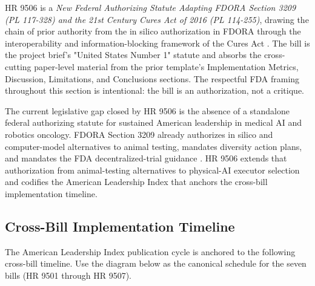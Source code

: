 
HR 9506 is a \textit{New Federal Authorizing Statute Adapting FDORA
Section 3209 (PL 117-328) and the 21st Century Cures Act of 2016
(PL 114-255)}, drawing the chain of prior authority from the in
silico authorization in FDORA through the interoperability and
information-blocking framework of the Cures Act
\cite{rank4_fdora_fda_modernization_2022, rank1_cures_act_2016}.
The bill is the project brief's "United States Number 1" statute and
absorbs the cross-cutting paper-level material from the prior
template's Implementation Metrics, Discussion, Limitations, and
Conclusions sections. The respectful FDA framing throughout this
section is intentional: the bill is an authorization, not a critique.

The current legislative gap closed by HR 9506 is the absence of a
standalone federal authorizing statute for sustained American
leadership in medical AI and robotics oncology. FDORA Section 3209
already authorizes in silico and computer-model alternatives to
animal testing, mandates diversity action plans, and mandates the
FDA decentralized-trial guidance \cite{rank4_fdora_fda_modernization_2022,
fda_dct_guidance_2024}. HR 9506 extends that authorization from
animal-testing alternatives to physical-AI executor selection and
codifies the American Leadership Index that anchors the cross-bill
implementation timeline.

\subsection{Cross-Bill Implementation Timeline}

The American Leadership Index publication cycle is anchored to the
following cross-bill timeline. Use the diagram below as the canonical
schedule for the seven bills (HR 9501 through HR 9507).

